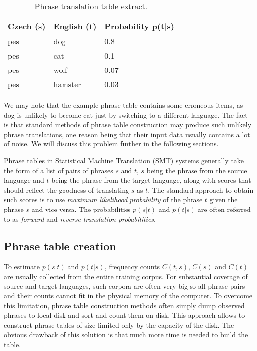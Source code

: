 \begin{table}[h]
\centering
\begin{tabular}{ l l l}
Czech (s) & English (t) & Probability p(t|s) \\
\hline
\hline
pes & dog & 0.8 \\
pes & cat & 0.1 \\
pes & wolf & 0.07 \\
pes & hamster & 0.03 \\
\hline
\hline
\end{tabular}
\caption{\label{phrase-table-example}Phrase translation table extract.}
\end{table}

We may note that the example phrase table contains some erroneous items,
as dog is unlikely to become cat just by switching to a different language.
The fact is that standard methods of phrase table construction may produce such
unlikely phrase translations, one reason being that their input data usually
contains a lot of noise.
We will discuss this problem further in the following sections.


Phrase tables in Statistical Machine Translation (SMT) systems generally take
the form of a list of pairs of phrases $s$ and $t$, $s$ being the phrase from
the source language and $t$ being the phrase from the target language, along
with scores that should reflect the goodness of translating $s$ as $t$.
The standard approach to obtain such scores is to use \emph{maximum likelihood
probability} of the phrase $t$ given the phrase $s$ and vice versa.
The probabilities $p(s|t)$ and $p(t|s)$ are often referred to as
\emph{forward} and \emph{reverse} \emph{translation probabilities}.


\subsection{Phrase table creation}


To estimate $p(s|t)$ and $p(t|s)$, frequency counts $C(t,s)$, $C(s)$ and
$C(t)$ are usually collected from the entire training corpus.
For substantial coverage of source and target languages, such corpora are
often very big so all phrase pairs and their counts cannot fit in the
physical memory of the computer.
To overcome this limitation, phrase table construction methods often simply
dump observed phrases to local disk and sort and count them on disk.
This approach allows to construct phrase tables of size limited only by the
capacity of the disk.
The obvious drawback of this solution is that much more time is needed
to build the table.

